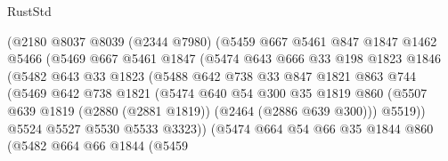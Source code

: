 \begin{lexlean}{RustStd}
\begin{coremodule}
                      (@2180
                        @8037
                        @8039
                        (@2344 @7980)
                        (@5459
                          @667
                          @5461
                          @847
                          @1847
                          @1462
                          @5466
                          (@5469
                            @667
                            @5461
                            @1847
                            (@5474
                              @643
                              @666
                              @33
                              @198
                              @1823
                              @1846
                              (@5482
                                @643
                                @33
                                @1823
                                (@5488
                                  @642
                                  @738
                                  @33
                                  @847
                                  @1821
                                  @863
                                  @744
                                  (@5469
                                    @642
                                    @738
                                    @1821
                                    (@5474
                                      @640
                                      @54
                                      @300
                                      @35
                                      @1819
                                      @860
                                      (@5507
                                        @639
                                        @1819
                                        (@2880 (@2881 @1819))
                                        (@2464 (@2886 @639 @300)))
                                      @5519))
                                  @5524
                                  @5527
                                  @5530
                                  @5533
                                  @3323))
                              (@5474
                                @664
                                @54
                                @66
                                @35
                                @1844
                                @860
                                (@5482
                                  @664
                                  @66
                                  @1844
                                  (@5459

\end{coremodule}
\end{lexlean}
